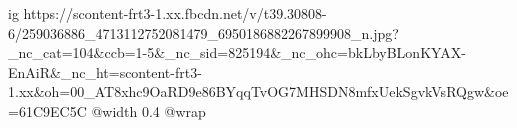  
 
 
 
 

\ifcmt
  ig https://scontent-frt3-1.xx.fbcdn.net/v/t39.30808-6/259036886_4713112752081479_6950186882267899908_n.jpg?_nc_cat=104&ccb=1-5&_nc_sid=825194&_nc_ohc=bkLbyBLonKYAX-EnAiR&_nc_ht=scontent-frt3-1.xx&oh=00_AT8xhc9OaRD9e86BYqqTvOG7MHSDN8mfxUekSgvkVsRQgw&oe=61C9EC5C
  @width 0.4
  @wrap 
\fi
